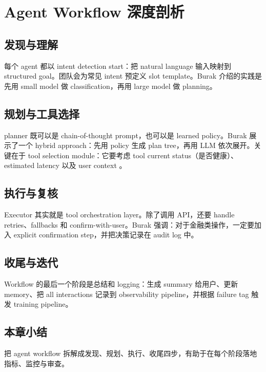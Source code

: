\section{Agent Workflow 深度剖析}

\subsection{发现与理解}

每个 agent 都以 intent detection start：把 natural language 输入映射到 structured goal。团队会为常见 intent 预定义 slot template。Burak 介绍的实践是先用 small model 做 classification，再用 large model 做 planning。

\subsection{规划与工具选择}

planner 既可以是 chain-of-thought prompt，也可以是 learned policy。Burak 展示了一个 hybrid approach：先用 policy 生成 plan tree，再用 LLM 依次展开。关键在于 tool selection module：它要考虑 tool current status（是否健康）、estimated latency 以及 user context 。

\subsection{执行与复核}

Executor 其实就是 tool orchestration layer。除了调用 API，还要 handle retries、fallbacks 和 confirm-with-user。Burak 强调：对于金融类操作，一定要加入 explicit confirmation step，并把决策记录在 audit log 中。

\subsection{收尾与迭代}

Workflow 的最后一个阶段是总结和 logging：生成 summary 给用户、更新 memory、把 all interactions 记录到 observability pipeline，并根据 failure tag 触发 training pipeline。

\subsection{本章小结}

把 agent workflow 拆解成发现、规划、执行、收尾四步，有助于在每个阶段落地指标、监控与审查。

